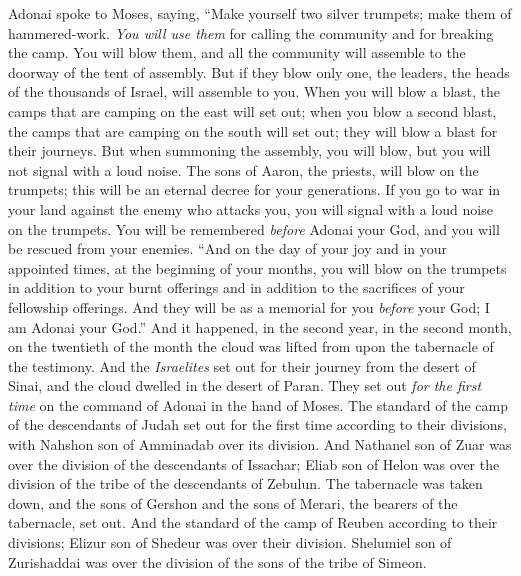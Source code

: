 \begin{biblechapter} %
 Adonai spoke to Moses, saying,
\verse “Make yourself two silver trumpets; make them of hammered-work. \textit{You will use them} for calling the community and for breaking the camp.
\verse You will blow them, and all the community will assemble to the doorway of the tent of assembly.
\verse But if they blow only one, the leaders, the heads of the thousands of Israel, will assemble to you.
\verse When you will blow a blast, the camps that are camping on the east will set out;
\verse when you blow a second blast, the camps that are camping on the south will set out; they will blow a blast for their journeys.
\verse But when summoning the assembly, you will blow, but you will not signal with a loud noise.
\verse The sons of Aaron, the priests, will blow on the trumpets; this will be an eternal decree for your generations.
\verse If you go to war in your land against the enemy who attacks you, you will signal with a loud noise on the trumpets. You will be remembered \textit{before} Adonai your God, and you will be rescued from your enemies.
\verse “And on the day of your joy and in your appointed times, at the beginning of your months, you will blow on the trumpets in addition to your burnt offerings and in addition to the sacrifices of your fellowship offerings. And they will be as a memorial for you \textit{before} your God; I am Adonai your God.”
 And it happened, in the second year, in the second month, on the twentieth of the month the cloud was lifted from upon the tabernacle of the testimony.
\verse And the \textit{Israelites} set out for their journey from the desert of Sinai, and the cloud dwelled in the desert of Paran.
\verse They set out \textit{for the first time} on the command of Adonai in the hand of Moses.
\verse The standard of the camp of the descendants of Judah set out for the first time according to their divisions, with Nahshon son of Amminadab over its division.
\verse And Nathanel son of Zuar was over the division of the descendants of Issachar;
\verse Eliab son of Helon was over the division of the tribe of the descendants of Zebulun.
\verse The tabernacle was taken down, and the sons of Gershon and the sons of Merari, the bearers of the tabernacle, set out.
\verse And the standard of the camp of Reuben according to their divisions; Elizur son of Shedeur was over their division.
\verse Shelumiel son of Zurishaddai was over the division of the sons of the tribe of Simeon.

\end{biblechapter}
